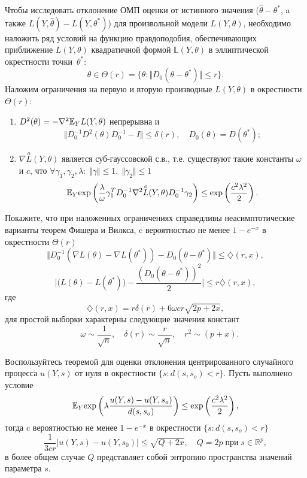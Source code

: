 \begin{problem}
Чтобы исследовать отклонение ОМП оценки от истинного значения ($\widehat{\theta} - \theta^*$, a также $L(Y,\widehat{\theta}) - L(Y, \theta^*)$) для произвольной модели $L(Y, \theta)$, необходимо наложить ряд условий на функцию правдоподобия, обеспечивающих приближение  $L(Y, \theta)$ квадратичной формой $\mathbb{L}(Y, \theta)$ в эллиптической окрестности точки~$\theta^*$:
\[
\theta \in \Theta(r) = \{\theta: \Vert D_0 (\theta  - \theta^*) \Vert  \leq r\}.
\]
Наложим ограничения на первую и вторую производные $L(Y, \theta)$ в окрестности $\Theta(r)$:
\begin{enumerate}
\item $D^2(\theta) = - \nabla^2 \mathrm{{\mathbb E}}_Y L(Y, \theta)$ непрерывна и  
\[
\Vert D_0^{-1} D^2(\theta) D_0^{-1} - I \Vert \leq \delta(r),
\quad
D_0(\theta) = D(\theta^*);
\]
\item  $\nabla \overset{o}{L}(Y, \theta)$ является суб-гауссовской с.в., т.е. существуют такие константы $\omega$ и $c$, что $\forall  \gamma_1, \gamma_2, \lambda: \; \Vert \gamma \Vert \leq 1, \; \Vert \gamma_2 \Vert \leq 1$
\[
\mathrm{{\mathbb E}}_Y \text{exp} \left( \frac{\lambda}{\omega} \gamma_1^{T} D_0^{-1} \nabla^2 \overset{o}{L}(Y, \theta) D_0^{-1} \gamma_2 \right) \leq \text{exp} \left( \frac{c^2 \lambda^2}{2}\right).
\]
\end{enumerate}
 
Покажите, что при наложенных ограничениях справедливы неасимптотические варианты теорем Фишера и Вилкса, c вероятностью не менее $1 - e^{-x}$ в окрестности $\Theta(r)$
\[
\Vert D_0^{-1} \left(  \nabla  L( \theta) -  \nabla  L(\theta^*) \right) - D_0 (\theta - \theta^*) \Vert \leq \diamondsuit (r,x),
\]
\[
\bigg| \bigg(L(\theta) - L(\theta^*) \bigg) - \frac{(D_0(\theta - \theta^{*}))^2}{2} \bigg| \leq r \diamondsuit (r,x),
\]
где
\[
\diamondsuit (r,x) = r \delta(r) + 6 \omega c  r \sqrt{2p + 2x},
\]
для простой выборки характерны следующие значения констант 
\[ 
\quad \omega \sim \frac{1}{\sqrt{n}}, 
\quad \delta(r) \sim \frac{r}{\sqrt{n}},
\quad r^2 \sim (p + x).
\]
 

\end{problem}

\begin{ordre}
Воспользуйтесь теоремой для оценки отклонения центрированного случайного процесса $u(Y,s)$ от нуля в окрестности $\{s: d(s,s_o) < r\}$. Пусть выполнено условие 
\[
\mathrm{{\mathbb E}}_Y \text{exp} \left( \lambda \frac{u(Y,s) - u(Y,s_o)}{d(s,s_o)}  \right) \leq \text{exp} \left( \frac{c^2 \lambda^2}{2}\right),
\]
тогда c вероятностью не менее $1 - e^{-x}$ в окрестности $\{s: d(s,s_o) < r\}$
\[
\frac{1}{3 c r} |u(Y, s) - u(Y, s_0)| \leq \sqrt{Q + 2x},
\quad Q = 2p \; \text{при} \; s \in \mathbb{R}^p,
\]
в более общем случае $Q$ представляет собой энтропию пространства значений параметра $s$. 
\end{ordre}

